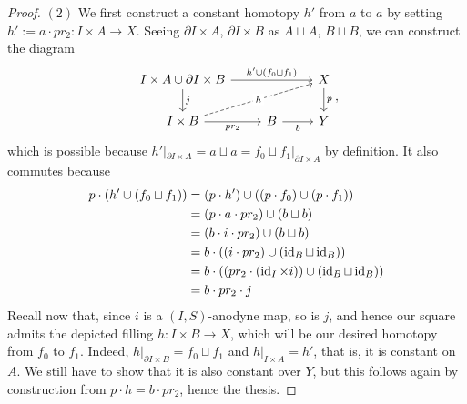 \documentclass[a4paper,11pt,openany]{scrartcl}
\begin{document}
\begin{proof}
    $(2)$ We first construct a constant homotopy $h'$ from $a$ to $a$ by
    setting $h':=a\cdot pr_2\colon I\times A\rightarrow X$. Seeing $\partial
    I\times A$, $\partial
    I\times B$ as $A\sqcup A$, $B\sqcup B$, we can construct the diagram
    \[\begin{tikzcd}
        {I\times A\cup\partial I\times B} && X \\
        {I\times B} & B & Y
        \arrow["p", from=1-3, to=2-3]
        \arrow["{h'\cup(f_0\sqcup f_1)}", from=1-1, to=1-3]
        \arrow["{j}", from=1-1, to=2-1]
        \arrow["{pr_2}"', from=2-1, to=2-2]
        \arrow["b"', from=2-2, to=2-3]
        \arrow["h"{description}, dashed, from=2-1, to=1-3]
    \end{tikzcd},\]
    which is possible because $h'|_{\partial I\times A}=a\sqcup a=f_0\sqcup
    f_1|_{\partial I\times A}$ by definition. It also commutes because
    \begin{align*}
        p\cdot(h'\cup(f_0\sqcup f_1))&=(p\cdot h')\cup ((p\cdot f_0)\cup(p\cdot
        f_1)) \\
        &=(p\cdot a\cdot pr_2)\cup(b\sqcup b) \\
        &=(b\cdot i\cdot pr_2)\cup(b\sqcup b) \\
        &=b\cdot ((i\cdot pr_2)\cup(\operatorname{id}_B\sqcup\operatorname{id}_B)) \\
        &=b\cdot((pr_2\cdot (\operatorname{id}_I\times i))\cup(\operatorname{id}_B\sqcup\operatorname{id}_B)) \\
        &=b\cdot pr_2\cdot j
    \end{align*}
    Recall now that, since $i$ is a $(I,S)$-anodyne map, so is $j$, and hence our
    square admits the depicted filling $h\colon I\times B\rightarrow X$, which
    will be our desired homotopy from $f_0$ to $f_1$. Indeed, $h|_{\partial
    I\times B}=f_0\sqcup f_1$ and $h|_{I\times A}=h'$, that is, it is constant on
    $A$. We still have to show that it is also constant over $Y$, but this
    follows again by construction from $p\cdot h=b\cdot pr_2$, hence the thesis.
\end{proof}
\end{document}

